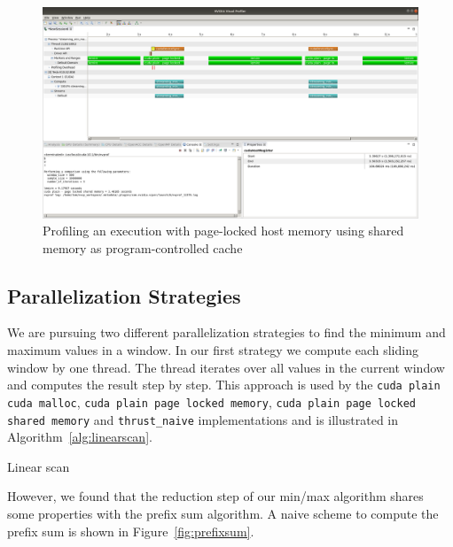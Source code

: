 \begin{figure}
    \centering
    \includegraphics[width=0.8\linewidth]{Figures/memory_shared}
    \caption{Profiling an execution with page-locked host memory using shared memory as program-controlled cache\label{fig:memory_shared}}
\end{figure}

\subsection{Parallelization Strategies}
\label{ch:parallelization}
We are pursuing two different parallelization strategies to find the minimum and maximum values in a window. In our first strategy we compute each sliding window by one thread. The thread iterates over all values in the current window and computes the result step by step. This approach is used by the \texttt{cuda plain \- cuda malloc}, \texttt{cuda plain \- page locked memory}, \texttt{cuda plain \- page locked shared memory} and \texttt{thrust\_naive} implementations and is illustrated in Algorithm~\ref{alg:linearscan}.

\begin{algorithm}[h]
    \caption{Linear scan}
    \label{alg:linearscan}
\end{algorithm}

However, we found that the reduction step of our min/max algorithm shares some properties with the prefix sum algorithm. A naive scheme to compute the prefix sum is shown in  Figure~\ref{fig:prefixsum}.

